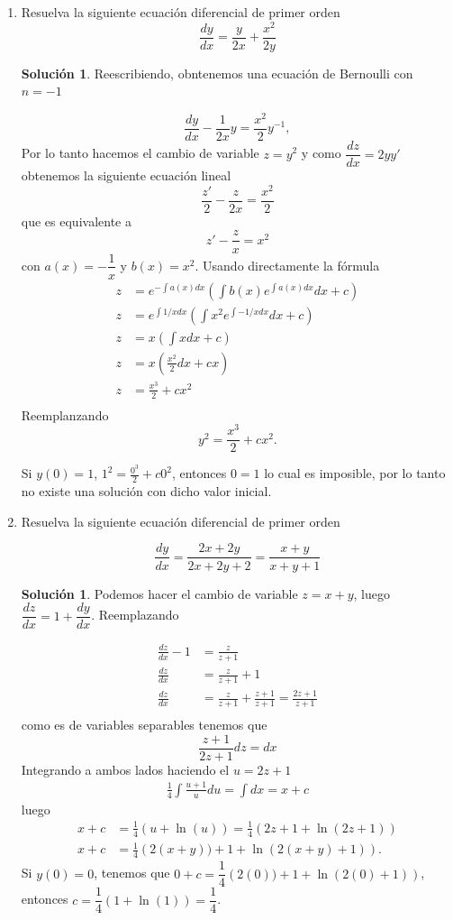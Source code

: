 \documentclass{article}
\theoremstyle{plain}
\theoremstyle{definition}
\newtheorem{sol}[thm]{Solución}
\begin{document}
\begin{enumerate}
\item Resuelva la siguiente ecuación diferencial de primer orden
\[\frac{dy}{dx}=\frac{y}{2x}+\frac{x^2}{2y}\]
\begin{sol}Reescribiendo, obntenemos una ecuación de Bernoulli con $n=-1$
\end{sol}
\[\frac{dy}{dx}-\frac{1}{2x}y=\frac{x^2}{2}y^{-1},\]
Por lo tanto hacemos el cambio de variable $z=y^2$ y como $\dfrac{dz}{dx}=2yy'$ obtenemos la siguiente ecuación lineal
\[\frac{z'}{2}-\frac{z}{2x}=\frac{x^2}{2}\]
que es equivalente a
\[z'-\frac{z}{x}=x^2\]
con $a(x)=-\dfrac{1}{x}$ y $b(x)=x^2$.
Usando directamente la fórmula
\begin{align*}
    z&=e^{-\int a(x)dx}\left(\int b(x)e^{\int a(x)dx}dx+c\right)\\
   z&=e^{\int 1/xdx}\left(\int x^2e^{\int -1/xdx}dx+c\right)\\
    z&=x\left(\int xdx+c\right)\\
    z&=x\left(\frac{x^2}{2}dx+cx\right)\\
    z&=\frac{x^3}{2}+cx^2\\
\end{align*}
Reemplanzando
\[    y^2=\frac{x^3}{2}+cx^2.\]

Si $y(0)=1$, $ 1^2=\frac{0^3}{2}+c0^2$, entonces $0=1$ lo cual es imposible, por lo tanto no existe una soluci\'on con dicho valor inicial.

    \item Resuelva la siguiente ecuación diferencial de primer orden

     \[\frac{dy}{dx}=\frac{2x+2y}{2x+2y+2}=\frac{x+y}{x+y+1}\]
\begin{sol}Podemos hacer el cambio de variable $z=x+y$, luego $\dfrac{dz}{dx}=1+\dfrac{dy}{dx}$. Reemplazando
\end{sol}
\begin{align*}
    \frac{dz}{dx}-1&=\frac{z}{z+1}\\
    \frac{dz}{dx}&=\frac{z}{z+1}+1\\
    \frac{dz}{dx}&=\frac{z}{z+1}+\frac{z+1}{z+1}=\frac{2z+1}{z+1}\\
\end{align*}
como es de variables separables tenemos que
\[\frac{z+1}{2z+1}dz=dx\]
Integrando a ambos lados haciendo el $u=2z+1$
\begin{align*}
    \frac{1}{4}\int \frac{u+1}{u}du=\int dx =x+c
\end{align*}
luego
\begin{align*}
    x+c&=\frac{1}{4}\left(u+\ln(u)\right)=\frac{1}{4}\left(2z+1+\ln(2z+1)\right)\\
        x+c&=\frac{1}{4}\left(2(x+y))+1+\ln(2(x+y)+1)\right).
\end{align*}
Si $y(0)=0$, tenemos que $0+c=\dfrac{1}{4}\left(2(0))+1+\ln(2(0)+1)\right)$, entonces $c=\dfrac{1}{4}\left(1+\ln(1)\right)=\dfrac{1}{4}$.


\end{enumerate}
\end{document}
